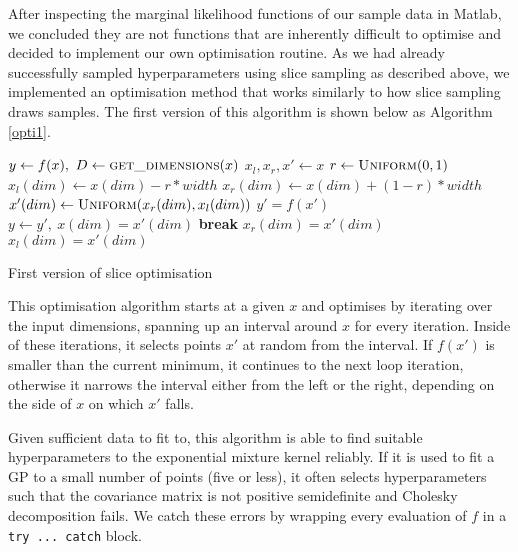 \documentclass[a4paper,12pt,twoside,openright]{report}
\newcommand{\Break}{\State \textbf{break} }
\begin{document}
After inspecting the marginal likelihood functions of our sample data in Matlab, we concluded they are not functions that are inherently difficult to optimise and decided to implement our own optimisation routine. As we had already successfully sampled hyperparameters using slice sampling as described above, we implemented an optimisation method that works similarly to how slice sampling draws samples. The first version of this algorithm is shown below as Algorithm \ref{opti1}.


\begin{algorithm}
\begin{algorithmic}[1]
\State $y\gets f(x),\ D\gets \Call{get\_dimensions}{x}$
\State $x_l, x_r, x'\gets x$
\State $r\gets \Call{Uniform}{0, 1}$
\State $x_l(dim)\gets x(dim) - r * width$
\State $x_r(dim)\gets x(dim) + (1 - r) * width$
\State $x'(dim)\gets \Call{Uniform}{x_r(dim), x_l(dim)}$
\State $y' = f(x')$
\State $y\gets y',\ x(dim) = x'(dim)$
\Break
\EndIf
{}
\State $x_r(dim) = x'(dim)$
\State $x_l(dim) = x'(dim)$
\EndIf
\EndFor
\EndFor
\EndFor
\EndProcedure
\end{algorithmic}
\caption{First version of slice optimisation}
\label{opti1}
\end{algorithm}

This optimisation algorithm starts at a given $x$ and optimises by iterating over the input dimensions, spanning up an interval around $x$ for every iteration. Inside of these iterations, it selects points $x'$ at random from the interval. If $f(x')$ is smaller than the current minimum, it continues to the next loop iteration, otherwise it narrows the interval either from the left or the right, depending on the side of $x$ on which $x'$ falls.

Given sufficient data to fit to, this algorithm is able to find suitable hyperparameters to the exponential mixture kernel reliably. If it is used to fit a GP to a small number of points (five or less), it often selects hyperparameters such that the covariance matrix is not positive semidefinite and Cholesky decomposition fails. We catch these errors by wrapping every evaluation of $f$ in a \texttt{try ... catch} block. 
\end{document}
